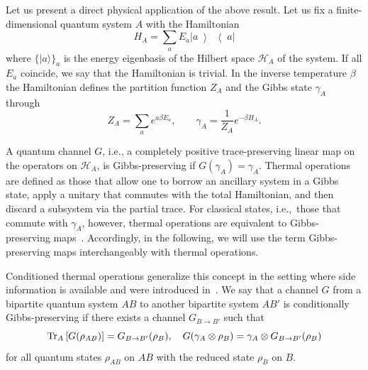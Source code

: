 \documentclass[aps,pra,11pt,onecolumn,nofootinbib,tightenlines]{revtex4-2}
\theoremstyle{definition}
\newcommand{\mc}[1]{\mathcal{#1}}
\newcommand{\ketbra}[2]{\left|#1\middle\rangle\middle\langle #2\right|}
\newcommand{\ptr}[2]{{\rm Tr}_{#1}\left[#2\right]}
\begin{document}
Let us present a direct physical application of the above result. Let us fix a finite-dimensional quantum system $A$ with the Hamiltonian
\begin{equation}
H_A=\sum_a E_a\ketbra{a}{a}
\end{equation}
where $\{|a\rangle\}_a$ is the energy eigenbasis of the Hilbert space $\mc H_A$ of the system. If all $E_a$ coincide, we say that the Hamiltonian is trivial. In the inverse temperature $\beta$ the Hamiltonian defines the partition function $Z_A$ and the Gibbs state $\gamma_A$ through
\begin{equation}
Z_A=\sum_a e^{a\beta E_a},\qquad \gamma_A=\frac{1}{Z_A}e^{-\beta H_A}.
\end{equation}

A quantum channel $G$, i.e., a completely positive trace-preserving linear map on the operators on $\mc H_A$, is Gibbs-preserving if $G(\gamma_A)=\gamma_A$. Thermal operations are defined as those that allow one to borrow an ancillary system in a Gibbs state, apply a unitary that commutes with the total Hamiltonian, and then discard a subsystem via the partial trace. For classical states, i.e.,\ those that commute with $\gamma_A$, however, thermal operations are equivalent to Gibbs-preserving maps~\cite{janzing2000thermodynamic,Oppenheim}. Accordingly, in the following, we will use the term Gibbs-preserving maps interchangeably with thermal operations.

Conditioned thermal operations generalize this concept in the setting where side information is available and were introduced in~\cite{narasimhachar2017resource}. We say that a channel $G$ from a bipartite quantum system $AB$ to another bipartite system $AB'$ is conditionally Gibbs-preserving if there exists a channel $G_{B\to B'}$ such that
\begin{equation}
\ptr{A}{G(\rho_{AB})}=G_{B\to B'}(\rho_B),\quad G(\gamma_A\otimes\rho_B)=\gamma_A\otimes G_{B\to B'}(\rho_B)
\end{equation}
for all quantum states $\rho_{AB}$ on $AB$ with the reduced state $\rho_B$ on $B$.
\end{document}
